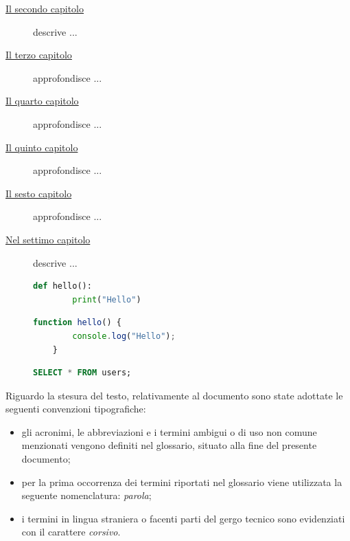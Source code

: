 \begin{description}
    \item[{\hyperref[cap:processi-metodologie]{Il secondo capitolo}}] descrive ...
    
    \item[{\hyperref[cap:descrizione-stage]{Il terzo capitolo}}] approfondisce ...
    
    \item[{\hyperref[cap:analisi-requisiti]{Il quarto capitolo}}] approfondisce ...
    
    \item[{\hyperref[cap:progettazione-codifica]{Il quinto capitolo}}] approfondisce ...
    
    \item[{\hyperref[cap:verifica-validazione]{Il sesto capitolo}}] approfondisce ...
    
    \item[{\hyperref[cap:conclusioni]{Nel settimo capitolo}}] descrive ...

    \begin{lstlisting}[language=Python, caption={Python example}]
    def hello():
        print("Hello")
    \end{lstlisting}

    \begin{lstlisting}[language=JavaScript, caption={JavaScript example}]
    function hello() {
        console.log("Hello");
    }
    \end{lstlisting}

    \begin{lstlisting}[language=SQL, caption={SQL example}]
    SELECT * FROM users;
    \end{lstlisting}

\end{description}



Riguardo la stesura del testo, relativamente al documento sono state adottate le seguenti convenzioni tipografiche:
\begin{itemize}
	\item gli acronimi, le abbreviazioni e i termini ambigui o di uso non comune menzionati vengono definiti nel glossario, situato alla fine del presente documento;
	\item per la prima occorrenza dei termini riportati nel glossario viene utilizzata la seguente nomenclatura: \emph{parola}\glsfirstoccur;
	\item i termini in lingua straniera o facenti parti del gergo tecnico sono evidenziati con il carattere \emph{corsivo}.
\end{itemize}

